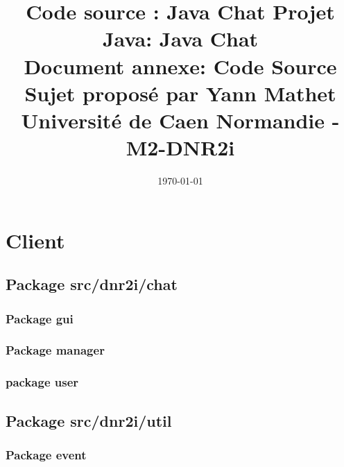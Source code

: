 \documentclass[a4paper,12pt]{report}
\title{Code source : Java Chat}
\title{%
  Projet Java: Java Chat \\
  \large Document annexe: Code Source \\
    Sujet proposé par Yann Mathet \\
    Université de Caen Normandie - M2-DNR2i}
\author{\authorName}
\date{\today}
\begin{document}
  \maketitle
  \tableofcontents

  \chapter{Client}
    \section{Package src/dnr2i/chat}
      \subsection{Package gui}
        
        
        
        
        
        
        
        
      \subsection{Package manager}
        
        
        
      \subsection{package user}
        
    \section{Package src/dnr2i/util}
      \subsection{Package event}
        
        
        
\end{document}
